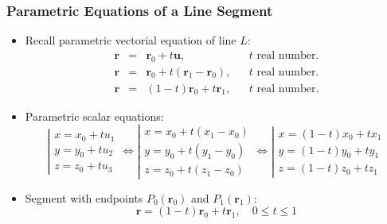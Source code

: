 \begin{frame}
\frametitle{Parametric Equations of a Line Segment}
\begin{itemize}
\item Recall parametric vectorial equation of line $L$:
\[\begin{array}{rclll}
\textbf{r} &=& \textbf{r}_0 +  t\textbf{u},  && t \text{ real number.}\\
\textbf{r} &=& \textbf{r}_0 + t(\textbf{r}_1-\textbf{r}_0), && t \text{ real number.}\\
\textbf{r} &=& (1-t)\textbf{r}_0 + t\textbf{r}_1, && t \text{ real number.}
\end{array}
\]
\item<2-> Parametric scalar equations:
%
$$\left| \begin{array}{l}
x  = x_0 + tu_1 \\
y  = y_0 + tu_2 \\
z  = z_0 + tu_3
\end{array}
\right. \Leftrightarrow \left| \begin{array}{l}
x  = x_0 + t(x_1-x_0) \\
y  = y_0 + t(y_1-y_0) \\
z  = z_0 + t(z_1-z_0)
\end{array}
\right. \Leftrightarrow \left| \begin{array}{l}
x  = (1-t)x_0 + tx_1 \\
y  = (1-t)y_0 + ty_1 \\
z  = (1-t)z_0 + tz_1
\end{array}
\right. $$
\item<3-> Segment with endpoints $P_0(\textbf{r}_0)$ and $P_1(\textbf{r}_1)$:
%
$$\textbf{r} = (1-t)\textbf{r}_0 + t\textbf{r}_1, \quad 0 \leqslant t \leqslant 1$$
\end{itemize}

\end{frame}